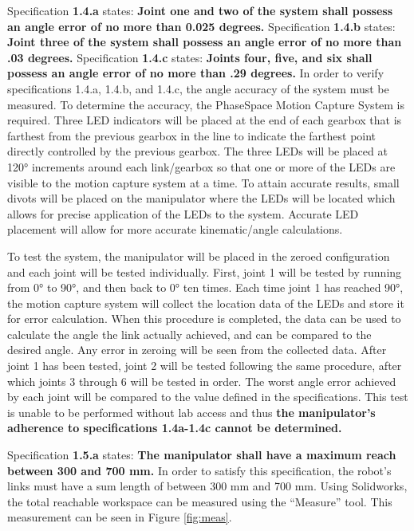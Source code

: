 Specification \textbf{1.4.a} states: \textbf{Joint one and two of the system shall possess an angle error of no more than 0.025 degrees.} Specification \textbf{1.4.b} states: \textbf{Joint three of the system shall possess an angle error of no more than .03 degrees.} Specification \textbf{1.4.c} states: \textbf{Joints four, five, and six shall possess an angle error of no more than .29 degrees.} In order to verify specifications 1.4.a, 1.4.b, and 1.4.c, the angle accuracy of the system must be measured. To determine the accuracy, the PhaseSpace Motion Capture System is required. Three LED indicators will be placed at the end of each gearbox that is farthest from the previous gearbox in the line to indicate the farthest point directly controlled by the previous gearbox. The three LEDs will be placed at 120° increments around each link/gearbox so that one or more of the LEDs are visible to the motion capture system at a time. To attain accurate results, small divots will be placed on the manipulator where the LEDs will be located which allows for precise application of the LEDs to the system. Accurate LED placement will allow for more accurate kinematic/angle calculations.

To test the system, the manipulator will be placed in the zeroed configuration and each joint will be tested individually. First, joint 1 will be tested by running from 0° to 90°, and then back to 0° ten times. Each time joint 1 has reached 90°, the motion capture system will collect the location data of the LEDs and store it for error calculation. When this procedure is completed, the data can be used to calculate the angle the link actually achieved, and can be compared to the desired angle. Any error in zeroing will be seen from the collected data. After joint 1 has been tested, joint 2 will be tested following the same procedure, after which joints 3 through 6 will be tested in order. The worst angle error achieved by each joint will be compared to the value defined in the specifications. This test is unable to be performed without lab access and thus \textbf{the manipulator’s adherence to specifications 1.4a-1.4c cannot be determined.}


Specification \textbf{1.5.a} states: \textbf{The manipulator shall have a maximum reach between 300 and 700 mm.} In order to satisfy this specification, the robot’s links must have a sum length of between 300 mm and 700 mm. Using Solidworks, the total reachable workspace can be measured using the “Measure” tool. This measurement can be seen in Figure \ref{fig:meas}.


